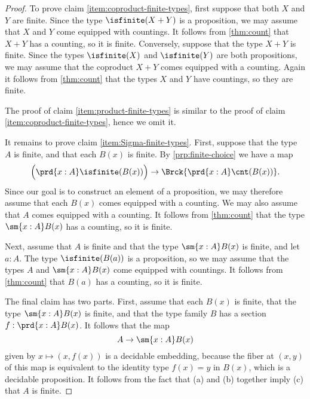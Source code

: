 \begin{proof}
  To prove claim \ref{item:coproduct-finite-types}, first suppose that both $X$ and $Y$ are finite. Since the type $\isfinite(X+Y)$ is a proposition, we may assume that $X$ and $Y$ come equipped with countings. It follows from \cref{thm:count} that $X+Y$ has a counting, so it is finite. Conversely, suppose that the type $X+Y$ is finite. Since the types $\isfinite(X)$ and $\isfinite(Y)$ are both propositions, we may assume that the coproduct $X+Y$ comes equipped with a counting. Again it follows from \cref{thm:count} that the types $X$ and $Y$ have countings, so they are finite.

  The proof of claim \ref{item:product-finite-types} is similar to the proof of claim \ref{item:coproduct-finite-types}, hence we omit it.

  It remains to prove claim \ref{item:Sigma-finite-types}. First, suppose that the type $A$ is finite, and that each $B(x)$ is finite. By \cref{prp:finite-choice} we have a map
  \begin{equation*}
    \Big(\prd{x:A}\isfinite(B(x))\Big)\to \Brck{\prd{x:A}\cnt(B(x))}.
  \end{equation*}
  Since our goal is to construct an element of a proposition, we may therefore assume that each $B(x)$ comes equipped with a counting. We may also assume that $A$ comes equipped with a counting. It follows from \cref{thm:count} that the type $\sm{x:A}B(x)$ has a counting, so it is finite.

  Next, assume that $A$ is finite and that the type $\sm{x:A}B(x)$ is finite, and let $a:A$. The type $\isfinite(B(a))$ is a proposition, so we may assume that the types $A$ and $\sm{x:A}B(x)$ come equipped with countings. It follows from \cref{thm:count} that $B(a)$ has a counting, so it is finite.

  The final claim has two parts. First, assume that each $B(x)$ is finite, that the type $\sm{x:A}B(x)$ is finite, and that the type family $B$ has a section $f:\prd{x:A}B(x)$. It follows that the map
  \begin{equation*}
    A\to\sm{x:A}B(x)
  \end{equation*}
  given by $x\mapsto (x,f(x))$ is a decidable embedding, because the fiber at $(x,y)$ of this map is equivalent to the identity type $f(x)=y$ in $B(x)$, which is a decidable proposition. It follows from the fact that (a) and (b) together imply (c) that $A$ is finite.


\end{proof}
